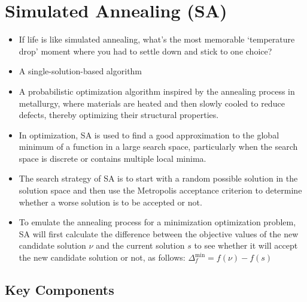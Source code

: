 \documentclass[
  letterpaper,
  DIV=11,
  numbers=noendperiod]{scrreprt}
\begin{document}

\chapter{Simulated Annealing (SA)}\label{simulated-annealing-sa}

\begin{itemize}
\item
  If life is like simulated annealing, what's the most memorable
  `temperature drop' moment where you had to settle down and stick to
  one choice?
\item
  A single-solution-based algorithm
\item
  A probabilistic optimization algorithm inspired by the annealing
  process in metallurgy, where materials are heated and then slowly
  cooled to reduce defects, thereby optimizing their structural
  properties.
\item
  In optimization, SA is used to find a good approximation to the global
  minimum of a function in a large search space, particularly when the
  search space is discrete or contains multiple local minima.
\item
  The search strategy of SA is to start with a random possible solution
  in the solution space and then use the Metropolis acceptance criterion
  to determine whether a worse solution is to be accepted or not.
\item
  To emulate the annealing process for a minimization optimization
  problem, SA will first calculate the difference between the objective
  values of the new candidate solution \(\nu\) and the current solution
  \(s\) to see whether it will accept the new candidate solution or not,
  as follows: \(\Delta_f^{\text{min}} = f(\nu) - f(s)\)
\end{itemize}

\section{Key Components}\label{key-components}
\end{document}
